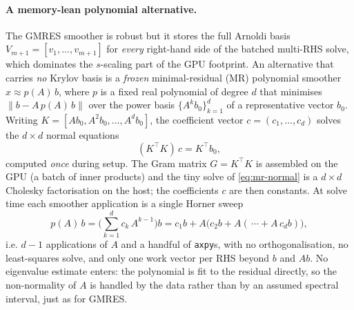 \documentclass[12pt,a4paper]{article}
\newcommand{\Aop}{A}
\newcommand{\norm}[1]{\left\lVert #1 \right\rVert}
\begin{document}
\paragraph{A memory-lean polynomial alternative.}
The GMRES smoother is robust but it stores the full Arnoldi basis
$V_{m+1}=[v_1,\dots,v_{m+1}]$ for \emph{every} right-hand side of the batched
multi-RHS solve, which dominates the $s$-scaling part of the GPU footprint. An
alternative that carries \emph{no} Krylov basis is a \emph{frozen} minimal-residual
(MR) polynomial smoother $x\approx p(\Aop)\,b$, where $p$ is a fixed real
polynomial of degree $d$ that minimises $\norm{b-\Aop\,p(\Aop)\,b}$ over the
power basis $\{\Aop^k b_0\}_{k=1}^{d}$ of a representative vector $b_0$. Writing
$K=[\Aop b_0,\Aop^2 b_0,\dots,\Aop^{d} b_0]$, the coefficient vector
$c=(c_1,\dots,c_d)$ solves the $d\times d$ normal equations
\begin{equation}
  (K^{\!\top}K)\,c = K^{\!\top}b_0 ,
  \label{eq:mr-normal}
\end{equation}
computed \emph{once} during setup. The Gram matrix $G=K^{\!\top}K$ is assembled
on the GPU (a batch of inner products) and the tiny solve of
\eqref{eq:mr-normal} is a $d\times d$ Cholesky factorisation on the host; the
coefficients $c$ are then constants. At solve time each smoother application is a
single Horner sweep
\begin{equation}
  p(\Aop)\,b=\Big(\!\sum_{k=1}^{d} c_k\,\Aop^{k-1}\Big)b
           = c_1 b + \Aop\big(c_2 b + \Aop(\,\cdots + \Aop\,c_d b)\big),
  \label{eq:horner}
\end{equation}
i.e. $d-1$ applications of $\Aop$ and a handful of \texttt{axpy}s, with no
orthogonalisation, no least-squares solve, and only one work vector per RHS
beyond $b$ and $\Aop b$. No eigenvalue estimate enters: the polynomial is fit to
the residual directly, so the non-normality of $\Aop$ is handled by the data
rather than by an assumed spectral interval, just as for GMRES.
\end{document}
